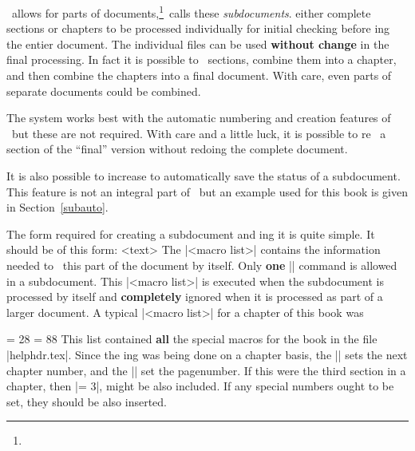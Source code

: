   \relax \fi %

\def\cqu{\cquote{Divide et Impera}{Ancient Roman political maxim}
          \cquote{For example, when the author prepared this manual, he did
               one chapter at a time,}{The \TeX book, Donald~E.~Knuth}
}

\intex\ allows for parts of documents,\footnote{\dagger}{\intex\ calls these
{\it subdocuments}.}
either complete sections or chapters
to be processed individually for initial checking before \tex ing the entier
document. The individual files can be used {\bf without change} in the final
processing. In fact it is possible to \tex\ sections, combine them into a
chapter, and then combine the chapters into a final document. With care, even
parts of separate documents could be combined.

The system works best with the automatic numbering and creation features of
\intex\ but these are not required. With care and a little luck, it is
possible to re \tex\ a section of the ``final'' version without redoing the
complete document. 

It is also possible to increase to automatically save the status of a
subdocument. This feature is not an integral part of \intex\ but an example
used for this book is given in Section~\ref{subauto}. 



The form required for creating a subdocument and \tex ing it is quite simple.
It should be of this form:
\begintt
{}
<text>
\done 
\endtt
The |<macro list>| contains the information needed to \tex\ this part of the
document by itself. Only {\bf one} |\subdocumentmacros| command is allowed in
a subdocument. This |<macro list>| is executed when the subdocument is
processed by itself and {\bf completely} ignored when it is processed as part
of a larger document. A typical |<macro list>| for a chapter of this book
was
\begintt

\following\chnum = 28
\pagenumber = 88
\endtt
This list contained {\bf all} the special macros for the book in the file
|helphdr.tex|. Since the \tex ing was being done on a chapter basis, the
|\following\chnum| sets the next chapter 
number, and the |\pagenumber| set the
pagenumber. If this were the third section in a chapter, then 
|\following\shnum = 3|, might be also included. If any special numbers ought to be
set, they should be also inserted. 

